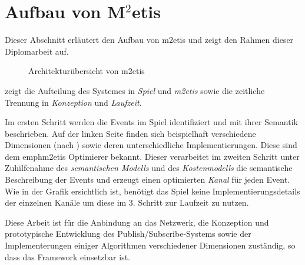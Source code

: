 \section{Aufbau von M$^2$etis}
\label{chap:grundlagen:aufbau_metis}

Dieser Abschnitt erläutert den Aufbau von \ac{m2etis} \cite{Fischer2010a, Fischer2010Event} und zeigt den Rahmen dieser Diplomarbeit auf. 

\begin{figure}[htbp]
\centering
{}
\caption{Architekturübersicht von \ac{m2etis}}
\label{fig:metis_aufbau}
\end{figure}

 zeigt die Aufteilung des Systemes in \emph{Spiel} und \emph{\ac{m2etis}} sowie die zeitliche Trennung in \emph{Konzeption} und \emph{Laufzeit}.

Im ersten Schritt werden die Events im Spiel identifiziert und mit ihrer Semantik beschrieben. Auf der linken Seite finden sich beispielhaft verschiedene Dimensionen (nach \cite{Fischer2010a}) sowie deren unterschiedliche Implementierungen. Diese sind dem emph{\ac{m2etis} Optimierer} bekannt. Dieser verarbeitet im zweiten Schritt unter Zuhilfenahme des \emph{semantischen Modells} und des \emph{Kostenmodells} die semantische Beschreibung der Events und erzeugt einen optimierten \emph{Kanal} für jeden Event. Wie in der Grafik ersichtlich ist, benötigt das Spiel keine  Implementierungsdetails der einzelnen Kanäle um diese im 3. Schritt zur Laufzeit zu nutzen.

Diese Arbeit ist für die Anbindung an das Netzwerk, die Konzeption und prototypische Entwicklung des Publish/Subscribe-Systems sowie der Implementerungen einiger Algorithmen verschiedener Dimensionen zuständig, so dass das Framework einsetzbar ist.
